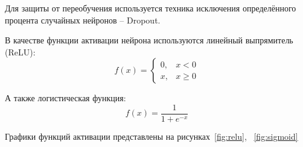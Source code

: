 Для защиты от переобучения используется техника исключения определённого процента случайных нейронов -- Dropout\cite{dropout}.

В качестве функции активации нейрона используются линейный выпрямитель (ReLU)\cite{relu}:
\begin{equation}
f(x) =
\begin{cases}
    0, & x < 0 \\
    x, & x \geq 0
\end{cases}\label{eq:relu}
\end{equation}

А также логистическая функция:
\begin{equation}
    f(x) = \frac{1}{1 + e^{-x}}\label{eq:sigmoid}
\end{equation}

\pagebreak
Графики функций активации представлены на рисунках~\ref{fig:relu}, ~\ref{fig:sigmoid}
